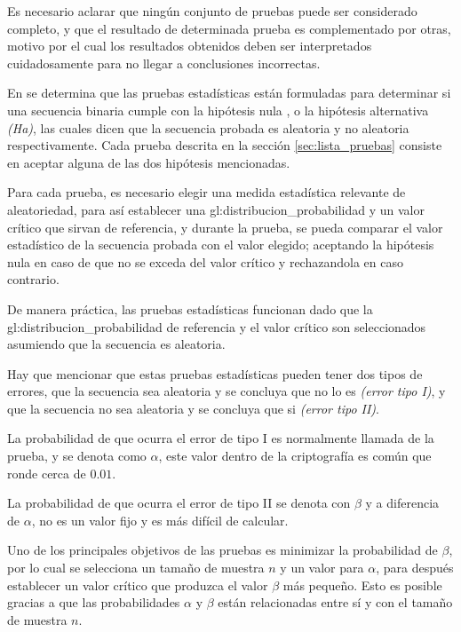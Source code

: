 Es necesario aclarar que ningún conjunto de pruebas puede ser considerado 
completo, y que el resultado de determinada prueba es complementado por 
otras, motivo por el cual los resultados obtenidos deben ser interpretados 
cuidadosamente para no llegar a conclusiones incorrectas.

En \cite{nist_pruebas} se determina que las pruebas estadísticas están 
formuladas para determinar si una secuencia binaria cumple con la hipótesis 
nula , o la hipótesis alternativa \textit{(Ha)}, las cuales dicen 
que la secuencia probada es aleatoria y no aleatoria respectivamente. Cada 
prueba descrita en la sección \ref{sec:lista_pruebas} consiste en aceptar 
alguna de las dos hipótesis mencionadas.

Para cada prueba, es necesario elegir una medida estadística relevante de 
aleatoriedad, para así establecer una \gls{gl:distribucion_probabilidad} y un 
valor crítico que sirvan de referencia, y durante la prueba, se pueda 
comparar el valor estadístico de la secuencia probada con el valor elegido; 
aceptando la hipótesis nula en caso de que no se exceda del valor crítico y 
rechazandola en caso contrario.

De manera práctica, las pruebas estadísticas funcionan dado que la 
\gls{gl:distribucion_probabilidad} de referencia y el valor crítico son 
seleccionados asumiendo que la secuencia es aleatoria.

Hay que mencionar que estas pruebas estadísticas pueden tener dos tipos de 
errores, que la secuencia sea aleatoria y se concluya que no lo es 
\textit{(error tipo I)}, y que la secuencia no sea aleatoria y se concluya 
que si \textit{(error tipo II)}.

La probabilidad de que ocurra el error de tipo I es normalmente llamada 
 de la prueba, y se denota como $\alpha$, este 
valor dentro de la criptografía es común que ronde cerca de $0.01$.

La probabilidad de que ocurra el error de tipo II se denota con $\beta$ y a 
diferencia de $\alpha$, no es un valor fijo y es más difícil de calcular.

Uno de los principales objetivos de las pruebas es minimizar la probabilidad 
de $\beta$, por lo cual se selecciona un tamaño de muestra $n$ y un valor para 
$\alpha$, para después establecer un valor crítico que produzca el valor 
$\beta$ más pequeño. Esto es posible gracias a que las probabilidades $\alpha$ 
y $\beta$ están relacionadas entre sí y con el tamaño de muestra $n$.

